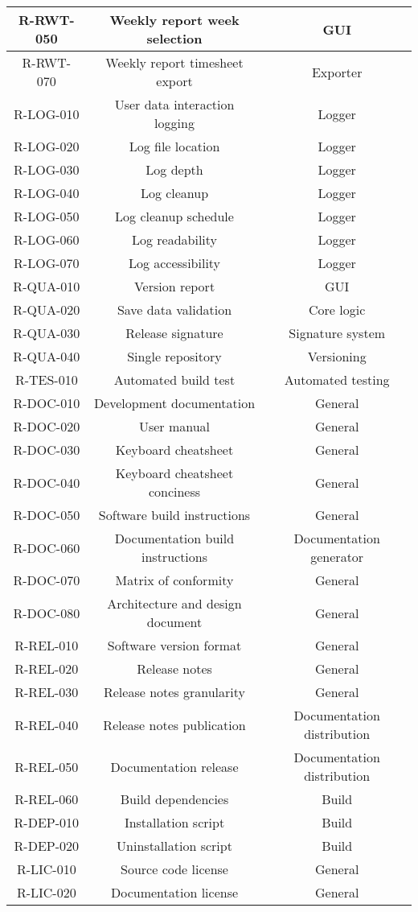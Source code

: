 \begin{longtable}{| c | c | c |}
  R-RWT-050 & Weekly report week selection & GUI \\ \hline
  R-RWT-070 & Weekly report timesheet export & Exporter \\ \hline
  R-LOG-010 & User data interaction logging & Logger \\ \hline
  R-LOG-020 & Log file location & Logger \\ \hline
  R-LOG-030 & Log depth & Logger \\ \hline
  R-LOG-040 & Log cleanup & Logger \\ \hline
  R-LOG-050 & Log cleanup schedule & Logger \\ \hline
  R-LOG-060 & Log readability & Logger \\ \hline
  R-LOG-070 & Log accessibility & Logger \\ \hline
  R-QUA-010 & Version report & GUI \\ \hline
  R-QUA-020 & Save data validation & Core logic \\ \hline
  R-QUA-030 & Release signature & Signature system \\ \hline
  R-QUA-040 & Single repository & Versioning \\ \hline
  R-TES-010 & Automated build test & Automated testing \\ \hline
  R-DOC-010 & Development documentation & General \\ \hline
  R-DOC-020 & User manual & General \\ \hline
  R-DOC-030 & Keyboard cheatsheet & General \\ \hline
  R-DOC-040 & Keyboard cheatsheet conciness & General \\ \hline
  R-DOC-050 & Software build instructions & General \\ \hline
  R-DOC-060 & Documentation build instructions & Documentation generator \\ \hline
  R-DOC-070 & Matrix of conformity & General \\ \hline
  R-DOC-080 & Architecture and design document & General \\ \hline
  R-REL-010 & Software version format & General \\ \hline
  R-REL-020 & Release notes & General \\ \hline
  R-REL-030 & Release notes granularity & General \\ \hline
  R-REL-040 & Release notes publication & Documentation distribution \\ \hline
  R-REL-050 & Documentation release & Documentation distribution \\ \hline
  R-REL-060 & Build dependencies & Build \\ \hline
  R-DEP-010 & Installation script & Build \\ \hline
  R-DEP-020 & Uninstallation script & Build \\ \hline
  R-LIC-010 & Source code license & General \\ \hline
  R-LIC-020 & Documentation license & General \\ \hline
\end{longtable}